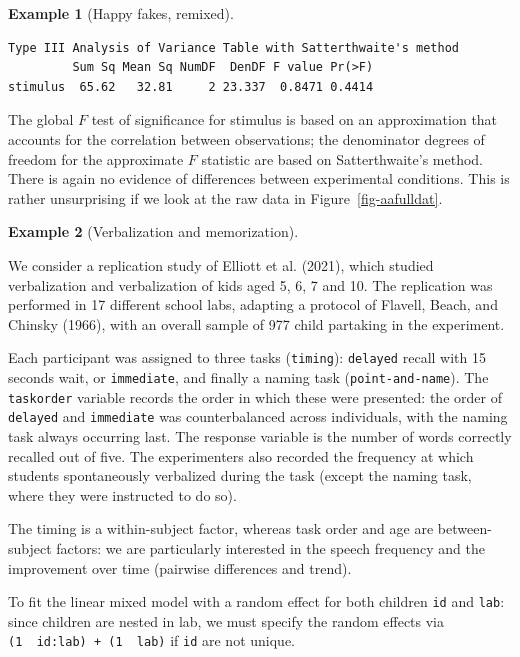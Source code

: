 \documentclass[
  11pt,
  letterpaper,
]{scrbook}
\theoremstyle{definition}
\newtheorem{example}{Example}[chapter]
\theoremstyle{remark}
\begin{document}
\begin{example}[Happy fakes,
remixed]
\begin{verbatim}
Type III Analysis of Variance Table with Satterthwaite's method
         Sum Sq Mean Sq NumDF  DenDF F value Pr(>F)
stimulus  65.62   32.81     2 23.337  0.8471 0.4414
\end{verbatim}

The global \(F\) test of significance for stimulus is based on an
approximation that accounts for the correlation between observations;
the denominator degrees of freedom for the approximate \(F\) statistic
are based on Satterthwaite's method. There is again no evidence of
differences between experimental conditions. This is rather unsurprising
if we look at the raw data in Figure~\ref{fig-aafulldat}.

\end{example}

\begin{example}[Verbalization and
memorization]\protect\hypertarget{exm-verbalization-memorization}{}\label{exm-verbalization-memorization}

We consider a replication study of Elliott et al. (2021), which studied
verbalization and verbalization of kids aged 5, 6, 7 and 10. The
replication was performed in 17 different school labs, adapting a
protocol of Flavell, Beach, and Chinsky (1966), with an overall sample
of 977 child partaking in the experiment.

Each participant was assigned to three tasks (\texttt{timing}):
\texttt{delayed} recall with 15 seconds wait, or \texttt{immediate}, and
finally a naming task (\texttt{point-and-name}). The \texttt{taskorder}
variable records the order in which these were presented: the order of
\texttt{delayed} and \texttt{immediate} was counterbalanced across
individuals, with the naming task always occurring last. The response
variable is the number of words correctly recalled out of five. The
experimenters also recorded the frequency at which students
spontaneously verbalized during the task (except the naming task, where
they were instructed to do so).

The timing is a within-subject factor, whereas task order and age are
between-subject factors: we are particularly interested in the speech
frequency and the improvement over time (pairwise differences and
trend).

To fit the linear mixed model with a random effect for both children
\texttt{id} and \texttt{lab}: since children are nested in lab, we must
specify the random effects via
\texttt{(1\ \textbar{}\ id:lab)\ +\ (1\ \textbar{}\ lab)} if \texttt{id}
are not unique.


\end{example}
\end{document}

